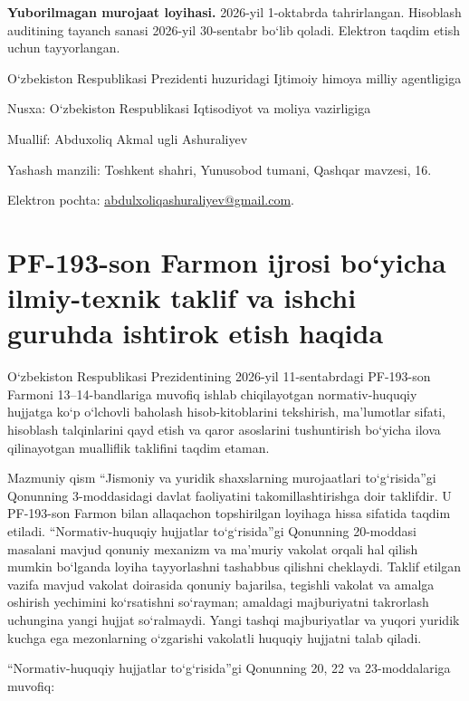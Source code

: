 \documentclass[14pt,a4paper]{extarticle}
\begin{document}
\textbf{Yuborilmagan murojaat loyihasi.} 2026-yil 1-oktabrda tahrirlangan. Hisoblash auditining tayanch sanasi 2026-yil 30-sentabr bo‘lib qoladi. Elektron taqdim etish uchun tayyorlangan.

O‘zbekiston Respublikasi Prezidenti huzuridagi Ijtimoiy himoya milliy agentligiga

Nusxa: O‘zbekiston Respublikasi Iqtisodiyot va moliya vazirligiga

Muallif: Abduxoliq Akmal ugli Ashuraliyev

Yashash manzili: Toshkent shahri, Yunusobod tumani, Qashqar mavzesi, 16.

Elektron pochta: \href{mailto:abdulxoliqashuraliyev@gmail.com}{abdulxoliqashuraliyev@gmail.com}.

\section*{PF-193-son Farmon ijrosi bo‘yicha ilmiy-texnik taklif va ishchi guruhda ishtirok etish haqida}
O‘zbekiston Respublikasi Prezidentining 2026-yil 11-sentabrdagi PF-193-son Farmoni 13–14-bandlariga muvofiq ishlab chiqilayotgan normativ-huquqiy hujjatga ko‘p o‘lchovli baholash hisob-kitoblarini tekshirish, ma’lumotlar sifati, hisoblash talqinlarini qayd etish va qaror asoslarini tushuntirish bo‘yicha ilova qilinayotgan mualliflik taklifini taqdim etaman.

Mazmuniy qism “Jismoniy va yuridik shaxslarning murojaatlari to‘g‘risida”gi Qonunning 3-moddasidagi davlat faoliyatini takomillashtirishga doir taklifdir. U PF-193-son Farmon bilan allaqachon topshirilgan loyihaga hissa sifatida taqdim etiladi. “Normativ-huquqiy hujjatlar to‘g‘risida”gi Qonunning 20-moddasi masalani mavjud qonuniy mexanizm va ma’muriy vakolat orqali hal qilish mumkin bo‘lganda loyiha tayyorlashni tashabbus qilishni cheklaydi. Taklif etilgan vazifa mavjud vakolat doirasida qonuniy bajarilsa, tegishli vakolat va amalga oshirish yechimini ko‘rsatishni so‘rayman; amaldagi majburiyatni takrorlash uchungina yangi hujjat so‘ralmaydi. Yangi tashqi majburiyatlar va yuqori yuridik kuchga ega mezonlarning o‘zgarishi vakolatli huquqiy hujjatni talab qiladi.

“Normativ-huquqiy hujjatlar to‘g‘risida”gi Qonunning 20, 22 va 23-moddalariga muvofiq:
\end{document}
